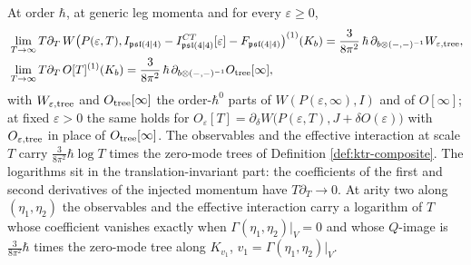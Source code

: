 \begin{theorem}
\label{thm:ktr-flowlog}
At order $\hbar$, at generic leg momenta and for every $\varepsilon\ge0$,
\begin{equation}
\begin{aligned}
&\lim_{T\to\infty}T\partial_T\,W\big(P(\varepsilon,T),I_{\mathfrak{psl}(4|4)}-I^{CT}_{\mathfrak{psl}(4|4)}[\varepsilon]-F_{\mathfrak{psl}(4|4)}\big)^{(1)}(K_b)=\frac{3}{8\pi^2}\,\hbar\,\partial_{b\otimes(-,-)^{-1}}W_{\varepsilon,\rm tree},\\
&\lim_{T\to\infty}T\partial_T\,O[T]^{(1)}(K_b)=\frac{3}{8\pi^2}\,\hbar\,\partial_{b\otimes(-,-)^{-1}}O_{\rm tree}[\infty],
\end{aligned}
\label{eq:ktr-flowlog}
\end{equation}
with $W_{\varepsilon,\rm tree}$ and $O_{\rm tree}[\infty]$ the order-$\hbar^0$ parts of $W(P(\varepsilon,\infty),I)$ and of $O[\infty]$; at fixed $\varepsilon>0$ the same holds for $O_\varepsilon[T]=\partial_\delta W\big(P(\varepsilon,T),J+\delta O(\varepsilon)\big)$ with $O_{\varepsilon,\rm tree}$ in place of $O_{\rm tree}[\infty]$. The observables and the effective interaction at scale $T$ carry $\tfrac{3}{8\pi^2}\hbar\log T$ times the zero-mode trees of Definition \ref{def:ktr-composite}. The logarithms sit in the translation-invariant part: the coefficients of the first and second derivatives of the injected momentum have $T\partial_T\to0$. At arity two along $(\eta_1,\eta_2)$ the observables and the effective interaction carry a logarithm of $T$ whose coefficient vanishes exactly when $\Gamma(\eta_1,\eta_2)|_V=0$ and whose $Q$-image is $\tfrac{3}{8\pi^2}\hbar$ times the zero-mode tree along $K_{v_1}$, $v_1=\Gamma(\eta_1,\eta_2)|_V$.
\end{theorem}

